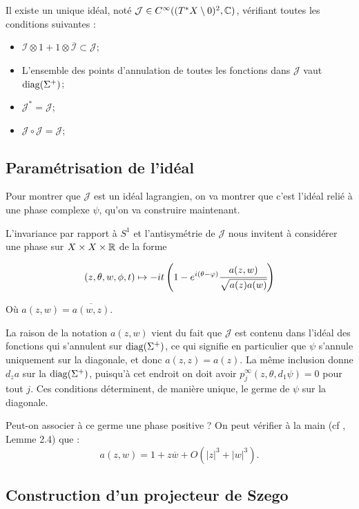 \begin{prop}
	Il existe un unique idéal, noté $\mathcal{J} \in C^{\infty}((T^*X\setminus 0)^2,\mathbb{C})$, vérifiant toutes les conditions suivantes :
	\begin{itemize}
		\item $\mathcal{I}\otimes 1 + 1 \otimes \overline{\mathcal{I}}\subset\mathcal{J}$;
		\item L'ensemble des points d'annulation de toutes les fonctions dans $\mathcal{J}$ vaut $\operatorname{diag}(\Sigma^+)$;
		\item $\mathcal{J}^*=\mathcal{J}$;
		\item $\mathcal{J}\circ\mathcal{J}=\mathcal{J}$;
	\end{itemize}
\end{prop}

\subsection{Paramétrisation de l'idéal}
Pour montrer que $\mathcal{J}$ est un idéal lagrangien, on va montrer que c'est l'idéal relié à une phase complexe $\psi$, qu'on va construire maintenant.

L'invariance par rapport à $S^1$ et l'antisymétrie de $\mathcal{J}$ nous invitent à considérer une phase sur $X \times X \times \mathbb{R}$ de la forme

\begin{equation*}
	(z, \theta ,w, \phi ,t) \mapsto -it\left(1-e^{i(\theta-\varphi)}\cfrac{a(z,w)}{\sqrt{a(z)a(w)}}\right)
\end{equation*}

Où $a(z,w)=\overline{a(w,z)}$.

La raison de la notation $a(z,w)$ vient du fait que $\mathcal{J}$ est contenu dans l'idéal des fonctions qui s'annulent sur $\operatorname{diag}(\Sigma^+)$, ce qui signifie en particulier que $\psi$ s'annule uniquement sur la diagonale, et donc $a(z,z)=a(z)$. La même inclusion donne $d_za$ sur la $\operatorname{diag}(\Sigma^+)$, puisqu'à cet endroit on doit avoir $p^{\infty}_j(z,\theta,d_1\psi)=0$ pour tout $j$. Ces conditions déterminent, de manière unique, le germe de $\psi$ sur la diagonale. 

Peut-on associer à ce germe une phase positive ? On peut vérifier à la main (cf \cite{Shiffman2002}, Lemme 2.4) que :
\begin{equation*}
	a(z,w) = 1 + z\overline{w} + O(|z|^3 + |w|^3).
\end{equation*}
\subsection{Construction d'un projecteur de Szego}

